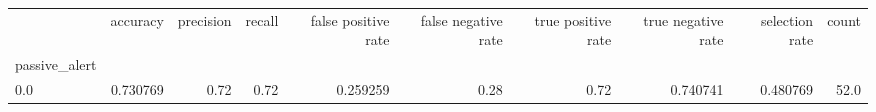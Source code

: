 \begin{tabular}{lrrrrrrrrr}
\toprule
{} &  accuracy &  precision &  recall &  false positive rate &  false negative rate &  true positive rate &  true negative rate &  selection rate &  count \\
passive\_alert &           &            &         &                      &                      &                     &                     &                 &        \\
\midrule
0.0           &  0.730769 &       0.72 &    0.72 &             0.259259 &                 0.28 &                0.72 &            0.740741 &        0.480769 &   52.0 \\
\bottomrule
\end{tabular}

